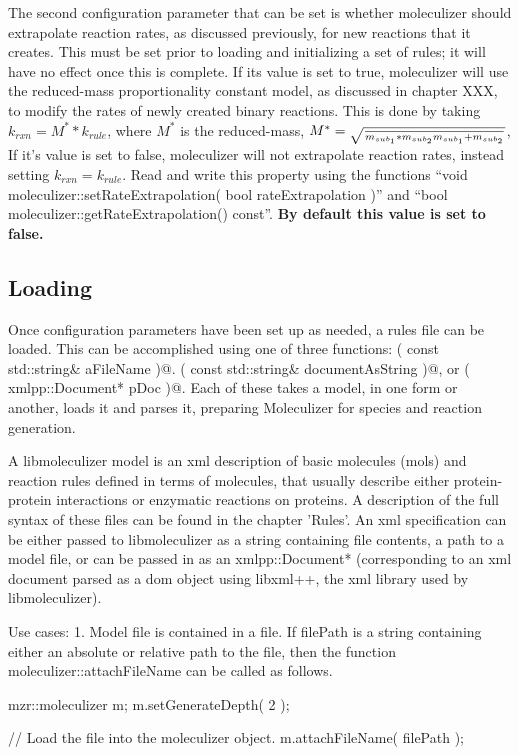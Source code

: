 The second configuration parameter that can be set is whether
moleculizer should extrapolate reaction rates, as discussed
previously, for new reactions that it creates.  This must be set prior
to loading and initializing a set of rules; it will have no effect
once this is complete.  If its value is set to true, moleculizer will
use the reduced-mass proportionality constant model, as discussed in
chapter XXX, to modify the rates of newly created binary reactions.
This is done by taking $k_{rxn} = M^* * k_{rule}$, where $M^*$ is the
reduced-mass, $M^*=\sqrt{\over{m_{sub_1} * m_{sub_2}}{m_{sub_1} +
    m_{sub_2}} }$,  If it's value is set to false, moleculizer will
not extrapolate reaction rates, instead setting $k_{rxn} = k_{rule}$.
Read and write this property using the functions ``void
moleculizer::setRateExtrapolation( bool rateExtrapolation )'' and 
``bool moleculizer::getRateExtrapolation() const''.  \bf{By default
  this value is set to false.}  

\subsection{Loading}
Once configuration parameters have been set up as needed, a rules file
can be loaded.  This can be accomplished using one of three functions:
\lstinline@attachFileName( const std::string& aFileName )@.
\lstinline@attachString( const std::string& documentAsString )@, or
\lstinline@attachDocument( xmlpp::Document* pDoc )@.  Each of these
takes a model, in one form or another, loads it and parses it,
preparing Moleculizer for species and reaction generation.

A libmoleculizer model is an xml description of basic molecules (mols) and
reaction rules defined in terms of molecules, that usually describe
either protein-protein interactions or enzymatic reactions on
proteins.  A description of the full syntax of these files can be
found in the chapter 'Rules'.  An xml specification can be either
passed to libmoleculizer as a string containing file contents, a path
to a model file, or can be passed in as an xmlpp::Document*
(corresponding to an xml document parsed as a dom object using
libxml++, the xml library used by libmoleculizer).

Use cases:
1.  Model file is contained in a file.
If filePath is a string containing either an absolute or relative path
to the file, then the function moleculizer::attachFileName can be
called as follows.  

\begin{ExampleCPP}[caption=Loading a MZR file into a running
  moleculizer instance]
mzr::moleculizer m;
m.setGenerateDepth( 2 );  

// Load the file into the moleculizer object.
m.attachFileName( filePath );
\end{ExampleCPP}


